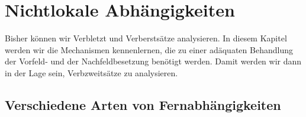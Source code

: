 
\chapter{Nichtlokale Abhängigkeiten}
\label{Kapitel-nla}

Bisher können wir Verbletzt und Verberstsätze analysieren. In diesem Kapitel werden wir
die Mechanismen kennenlernen, die zu einer adäquaten Behandlung der Vorfeld- und
der Nachfeldbesetzung benötigt werden. Damit werden wir dann in der Lage sein, Verbzweitsätze
zu analysieren.

\section{Verschiedene Arten von Fernabhängigkeiten}


